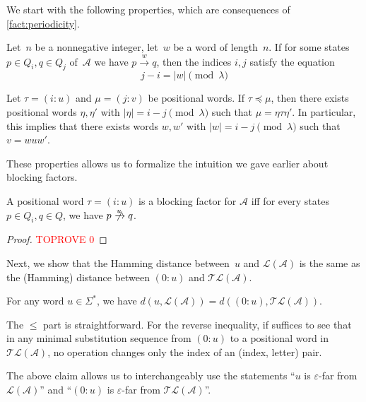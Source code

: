 \documentclass[letterpaper, USenglish, cleveref, autoref, thm-restate, numberwithinsect]{lipics-v2021}
\theoremstyle{theorem}
\theoremstyle{definition}
\newcommand{\Aa}{\mathcal{A}}
\newcommand{\eps}{\varepsilon}
\newcommand{\factor}{\preccurlyeq}
\newcommand{\lang}[1]{\mathcal{L}(#1)}
\newcommand{\timedlang}[1]{\mathcal{TL}( #1 )}
\newcommand{\timedword}[2]{(#1:#2)}
\newcommand{\twu}{\timedword{0}{u}}
\begin{document}
We start with the following properties, which are consequences of \cref{fact:periodicity}.
\begin{corollary}\label{corollary:position-length}
    Let~$n$ be a nonnegative integer, let~$w$ be a word of length~$n$.
    If for some states $p\in Q_i, q\in Q_j$ of~$\Aa$ we have $p\xrightarrow{w}q$,
    then the indices $i,j$ satisfy the equation
    \begin{equation*}
        j-i = |w| \pmod{\lambda}
    \end{equation*}
\end{corollary}
\begin{corollary}\label{corollary:position-factor}
    Let $\tau = \timedword{i}{u}$ and $\mu = \timedword{j}{v}$ be positional words.
    If $\tau \factor \mu$, then there exists positional words $\eta, \eta'$ with $|\eta| = i-j \pmod{\lambda}$
    such that $\mu = \eta\tau\eta'$.
    In particular, this implies that there exists words $w,w'$ with $|w| = i-j \pmod{\lambda}$
    such that $v = wuw'$.
\end{corollary}

These properties allows us to formalize the intuition we gave earlier about blocking factors.

\begin{lemma}\label{lemma:intuition-timed-word}
    A positional word $\tau = \timedword{i}{u}$ is a blocking factor for $\Aa$
    iff for every states $p\in Q_i, q\in Q$, we have $p\centernot{\xrightarrow{u}}q$.
\end{lemma}

\begin{proof}\textcolor{red}{TOPROVE 0}\end{proof}

Next, we show that the Hamming distance between~$u$ and $\lang{\Aa}$ is the same as the (Hamming) distance between $\twu$ and $\timedlang{\Aa}$.
\begin{claim}\label{claim:far-equiv}
    For any word $u\in\Sigma^*$, we have $d(u, \lang{\Aa}) = d(\twu, \timedlang{\Aa})$.
\end{claim}
\begin{claimproof}
    The $\le$ part is straightforward.
    For the reverse inequality, if suffices to see that in any minimal substitution sequence from $\twu$
    to a positional word in $\timedlang{\Aa}$, no operation changes only the index of an (index, letter) pair.
\end{claimproof}
The above claim allows us to interchangeably use the statements ``$u$ is $\eps$-far from $\lang{\Aa}$'' and ``$\twu$ is $\eps$-far from $\timedlang{\Aa}$''.
\end{document}
